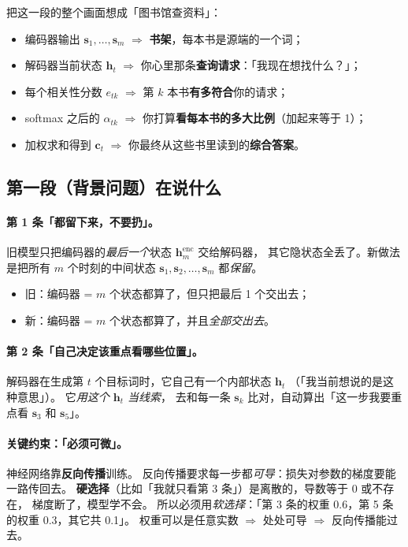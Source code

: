 \documentclass[11pt,a4paper]{ctexart}
\newcommand{\vect}[1]{\boldsymbol{#1}}
\begin{document}
\begin{intuitionblock}
把这一段的整个画面想成「图书馆查资料」：

\begin{itemize}
  \item 编码器输出 $\vect{s}_1, \dots, \vect{s}_m$
        $\Rightarrow$ \textbf{书架}，每本书是源端的一个词；
  \item 解码器当前状态 $\vect{h}_t$
        $\Rightarrow$ 你心里那条\textbf{查询请求}：「我现在想找什么？」；
  \item 每个相关性分数 $e_{tk}$
        $\Rightarrow$ 第 $k$ 本书\textbf{有多符合}你的请求；
  \item softmax 之后的 $\alpha_{tk}$
        $\Rightarrow$ 你打算\textbf{看每本书的多大比例}（加起来等于 1）；
  \item 加权求和得到 $\vect{c}_t$
        $\Rightarrow$ 你最终从这些书里读到的\textbf{综合答案}。
\end{itemize}
\end{intuitionblock}

\subsection{第一段（背景问题）在说什么}

\paragraph{第 1 条「都留下来，不要扔」。}
旧模型只把编码器的\emph{最后一个}状态 $\vect{h}^{\text{enc}}_m$ 交给解码器，
其它隐状态全丢了。新做法是把所有 $m$ 个时刻的中间状态
$\vect{s}_1, \vect{s}_2, \dots, \vect{s}_m$ 都\emph{保留}。

\begin{itemize}
  \item 旧：编码器 = $m$ 个状态都算了，但只把最后 1 个交出去；
  \item 新：编码器 = $m$ 个状态都算了，并且\emph{全部交出去}。
\end{itemize}

\paragraph{第 2 条「自己决定该重点看哪些位置」。}
解码器在生成第 $t$ 个目标词时，它自己有一个内部状态 $\vect{h}_t$
（「我当前想说的是这种意思」）。
它\emph{用这个 $\vect{h}_t$ 当线索}，
去和每一条 $\vect{s}_k$ 比对，自动算出「这一步我要重点看 $\vect{s}_3$ 和 $\vect{s}_5$」。

\paragraph{关键约束：「必须可微」。}
神经网络靠\textbf{反向传播}训练。
反向传播要求每一步都\emph{可导}：损失对参数的梯度要能一路传回去。
\textbf{硬选择}（比如「我就只看第 3 条」）是离散的，导数等于 0 或不存在，
梯度断了，模型学不会。
所以必须用\emph{软选择}：「第 3 条的权重 0.6，第 5 条的权重 0.3，其它共 0.1」。
权重可以是任意实数 $\Rightarrow$ 处处可导 $\Rightarrow$ 反向传播能过去。
\end{document}

